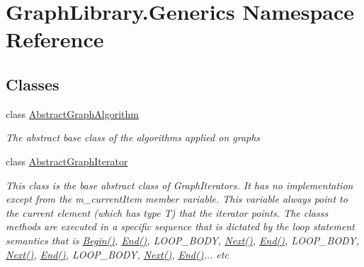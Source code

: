 \hypertarget{namespace_graph_library_1_1_generics}{}\section{Graph\+Library.\+Generics Namespace Reference}
\label{namespace_graph_library_1_1_generics}
\subsection*{Classes}
\begin{DoxyCompactItemize}
\item 
class \hyperlink{class_graph_library_1_1_generics_1_1_abstract_graph_algorithm}{Abstract\+Graph\+Algorithm}
\begin{DoxyCompactList}\small\item\em The abstract base class of the algorithms applied on graphs \end{DoxyCompactList}\item 
class \hyperlink{class_graph_library_1_1_generics_1_1_abstract_graph_iterator}{Abstract\+Graph\+Iterator}
\begin{DoxyCompactList}\small\item\em This class is the base abstract class of Graph\+Iterators. It has no implementation except from the m\+\_\+current\+Item member variable. This variable always point to the current element (which has type T) that the iterator points. The class\textquotesingle{}s methods are executed in a specific sequence that is dictated by the loop statement semantics that is \hyperlink{class_graph_library_1_1_generics_1_1_abstract_graph_iterator_a2c97c7a412c233b8442b7ad403f29779}{Begin()}, \hyperlink{class_graph_library_1_1_generics_1_1_abstract_graph_iterator_aa8cd9f596ec0b6c4c1e9c244ba75df04}{End()}, L\+O\+O\+P\+\_\+\+B\+O\+D\+Y, \hyperlink{class_graph_library_1_1_generics_1_1_abstract_graph_iterator_aac8cffd0d579708a94ba056e4f4a00b2}{Next()}, \hyperlink{class_graph_library_1_1_generics_1_1_abstract_graph_iterator_aa8cd9f596ec0b6c4c1e9c244ba75df04}{End()}, L\+O\+O\+P\+\_\+\+B\+O\+D\+Y, \hyperlink{class_graph_library_1_1_generics_1_1_abstract_graph_iterator_aac8cffd0d579708a94ba056e4f4a00b2}{Next()}, \hyperlink{class_graph_library_1_1_generics_1_1_abstract_graph_iterator_aa8cd9f596ec0b6c4c1e9c244ba75df04}{End()}, L\+O\+O\+P\+\_\+\+B\+O\+D\+Y, \hyperlink{class_graph_library_1_1_generics_1_1_abstract_graph_iterator_aac8cffd0d579708a94ba056e4f4a00b2}{Next()}, \hyperlink{class_graph_library_1_1_generics_1_1_abstract_graph_iterator_aa8cd9f596ec0b6c4c1e9c244ba75df04}{End()}... etc \end{DoxyCompactList}\item 

\end{DoxyCompactItemize}
